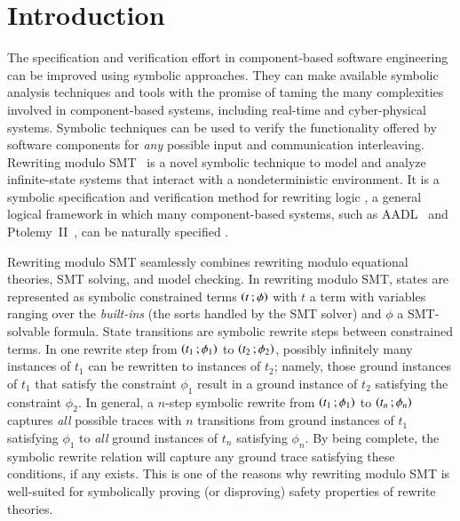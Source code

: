 
\section{Introduction}
\label{sec.intro}


The specification and verification effort in component-based software
engineering 
can be
improved using symbolic approaches.  They can make available symbolic analysis %
techniques and tools with the promise of taming the
many complexities involved in component-based systems, including real-time and cyber-physical
systems. %
Symbolic techniques can be used
to verify the functionality offered by software components for
\emph{any} possible input and communication interleaving. Rewriting
modulo SMT~\cite{rocha-rewsmtjlamp-2017} is a novel symbolic technique
to model and analyze %
infinite-state systems
that interact with a nondeterministic environment. 
It is a symbolic
specification and verification method for 
rewriting logic \cite{meseguer-rltcs-1992},
a general logical framework
in which many component-based systems,
such as AADL~\cite{mr-synch-aadl-fm14} and Ptolemy~II~\cite{ptolemy-journal}, %
can be naturally specified \cite{meseguer2012twenty}.

Rewriting modulo SMT seamlessly combines rewriting modulo
equational theories, SMT solving, and model checking.
%
In rewriting modulo SMT, states are represented as symbolic
constrained terms $\left( t \,; \phi \right)$ with $t$ a term with variables
ranging over the \emph{built-ins} (the sorts handled by the SMT
solver) and $\phi$ a SMT-solvable formula. State transitions are %
symbolic rewrite steps between constrained terms.  In one
rewrite step from $\left( t_1 \,; \phi_1 \right)$ to $\left( t_2 \,; \phi_2 \right)$,
possibly infinitely many instances of $t_1$ can be rewritten to
instances of $t_2$; namely, those ground instances of $t_1$ that
satisfy the constraint $\phi_1$ %
result in a ground instance of
$t_2$ satisfying the constraint $\phi_2$. In general, a $n$-step
symbolic rewrite from $\left( t_1 \,; \phi_1 \right)$ to $\left( t_n \,; \phi_n \right)$
captures \emph{all} possible traces with $n$ %
transitions from
ground instances of $t_1$ satisfying $\phi_1$ to \emph{all} ground
instances of $t_n$ satisfying $\phi_n$. By being complete, the
symbolic rewrite relation will capture any ground trace satisfying
these conditions, if any exists. This is one of the reasons why
rewriting modulo SMT is %
well-suited %
 for symbolically
proving (or disproving) safety properties of rewrite theories.

